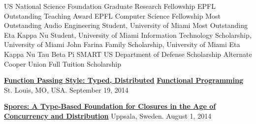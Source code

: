 \documentclass[9pt]{article}
\begin{document}
\noindent US National Science Foundation Graduate Research Fellowship 
\newline\noindent EPFL Outstanding Teaching Award 
\newline\noindent EPFL Computer Science Fellowship 
\newline\noindent Most Outstanding Audio Engineering Student, University of Miami 
\newline\noindent Most Outstanding Eta Kappa Nu Student, University of Miami 
\newline\noindent Information Technology Scholarship, University of Miami 
\newline\noindent John Farina Family Scholarship, University of Miami 
\newline\noindent Eta Kappa Nu 
\newline\noindent Tau Beta Pi 
\newline\noindent SMART US Department of Defense Scholarship Alternate 
\newline\noindent Cooper Union Full Tuition Scholarship 

\bigskip


\medskip
{}

\vspace{-0.02in}
\noindent\href{https://speakerdeck.com/heathermiller/function-passing-style-typed-distributed-functional-programming}{\bf Function Passing Style: Typed, Distributed} \vspace{-0.03in}
\linebreak\noindent\href{https://speakerdeck.com/heathermiller/function-passing-style-typed-distributed-functional-programming}{\bf Functional Programming}\dates{}
\linebreak\noindent St. Louis, MO, USA. September 19, 2014
\bigskip


\noindent\href{https://speakerdeck.com/heathermiller/spores-a-type-based-foundation-for-closures-in-the-age-of-concurrency-and-distribution}{\bf Spores: A Type-Based Foundation for Closures in the Age of} \vspace{-0.03in}
\linebreak\noindent\href{https://speakerdeck.com/heathermiller/spores-a-type-based-foundation-for-closures-in-the-age-of-concurrency-and-distribution}{\bf Concurrency and Distribution}\dates{}
\linebreak\noindent Uppsala, Sweden. August 1, 2014
\bigskip
\end{document}
